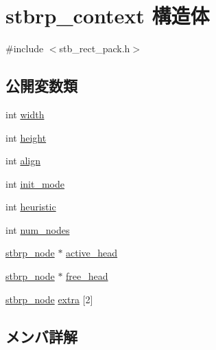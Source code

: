 \hypertarget{structstbrp__context}{}\section{stbrp\+\_\+context 構造体}
\label{structstbrp__context}


{\ttfamily \#include $<$stb\+\_\+rect\+\_\+pack.\+h$>$}

\subsection*{公開変数類}
\begin{DoxyCompactItemize}
\item 
int \mbox{\hyperlink{structstbrp__context_a70cfcb2044ce8397cc440d28b30c09b2}{width}}
\item 
int \mbox{\hyperlink{structstbrp__context_af3715a6f3faecfb4fac8f6ccbb71f9c7}{height}}
\item 
int \mbox{\hyperlink{structstbrp__context_ae36053e2001a725aec2b5756dc990481}{align}}
\item 
int \mbox{\hyperlink{structstbrp__context_a007509feee322404083034e4c2d3dc5d}{init\+\_\+mode}}
\item 
int \mbox{\hyperlink{structstbrp__context_a4b61a7f94e50a54c075e2a8f99f6503a}{heuristic}}
\item 
int \mbox{\hyperlink{structstbrp__context_afa8105d4ef6d3e0ae5aaf8e1ed4b2c58}{num\+\_\+nodes}}
\item 
\mbox{\hyperlink{structstbrp__node}{stbrp\+\_\+node}} $\ast$ \mbox{\hyperlink{structstbrp__context_a13277239636803aff28f00b0a0376120}{active\+\_\+head}}
\item 
\mbox{\hyperlink{structstbrp__node}{stbrp\+\_\+node}} $\ast$ \mbox{\hyperlink{structstbrp__context_a1336ae32373663847866cc65904c2839}{free\+\_\+head}}
\item 
\mbox{\hyperlink{structstbrp__node}{stbrp\+\_\+node}} \mbox{\hyperlink{structstbrp__context_a0b80e1fbdac125427526f3500d4e7624}{extra}} \mbox{[}2\mbox{]}
\end{DoxyCompactItemize}


\subsection{メンバ詳解}
\mbox{\label{structstbrp__context_a13277239636803aff28f00b0a0376120}} 
